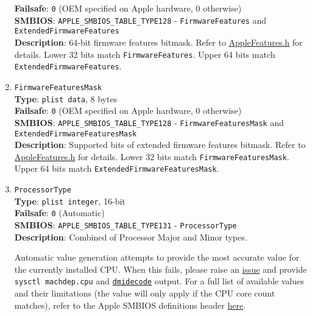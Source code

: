 \documentclass[]{article}
\begin{document}
\begin{enumerate}
  \textbf{Failsafe}: \texttt{0} (OEM specified on Apple hardware, 0 otherwise)\\
  \textbf{SMBIOS}: \texttt{APPLE\_SMBIOS\_TABLE\_TYPE128} -
  \texttt{FirmwareFeatures} and \texttt{ExtendedFirmwareFeatures}\\
  \textbf{Description}: 64-bit firmware features bitmask. Refer to
  \href{https://github.com/acidanthera/OpenCorePkg/blob/master/Include/Apple/IndustryStandard/AppleFeatures.h}{AppleFeatures.h}
  for details. Lower 32 bits match \texttt{FirmwareFeatures}. Upper
  64 bits match \texttt{ExtendedFirmwareFeatures}.
\item
  \texttt{FirmwareFeaturesMask}\\
  \textbf{Type}: \texttt{plist\ data}, 8 bytes\\
  \textbf{Failsafe}: \texttt{0} (OEM specified on Apple hardware, 0 otherwise)\\
  \textbf{SMBIOS}: \texttt{APPLE\_SMBIOS\_TABLE\_TYPE128} -
  \texttt{FirmwareFeaturesMask} and
  \texttt{ExtendedFirmwareFeaturesMask}\\
  \textbf{Description}: Supported bits of extended firmware features
  bitmask. Refer to
  \href{https://github.com/acidanthera/OpenCorePkg/blob/master/Include/Apple/IndustryStandard/AppleFeatures.h}{AppleFeatures.h}
  for details. Lower 32 bits match \texttt{FirmwareFeaturesMask}.
  Upper 64 bits match \texttt{ExtendedFirmwareFeaturesMask}.
\item
  \texttt{ProcessorType}\\
  \textbf{Type}: \texttt{plist\ integer}, 16-bit\\
  \textbf{Failsafe}: \texttt{0} (Automatic)\\
  \textbf{SMBIOS}: \texttt{APPLE\_SMBIOS\_TABLE\_TYPE131} -
  \texttt{ProcessorType}\\
  \textbf{Description}: Combined of Processor Major and Minor types.

  Automatic value generation attempts to provide the most accurate value for
  the currently installed CPU. When this fails, please raise an
  \href{https://github.com/acidanthera/bugtracker/issues}{issue} and
  provide \texttt{sysctl machdep.cpu} and
  \href{https://github.com/acidanthera/dmidecode}{\texttt{dmidecode}} output.
  For a full list of available values and their limitations (the value will
  only apply if the CPU core count matches), refer to the Apple SMBIOS definitions header
  \href{https://github.com/acidanthera/OpenCorePkg/blob/master/Include/Apple/IndustryStandard/AppleSmBios.h}{here}.
\end{enumerate}
\end{document}
